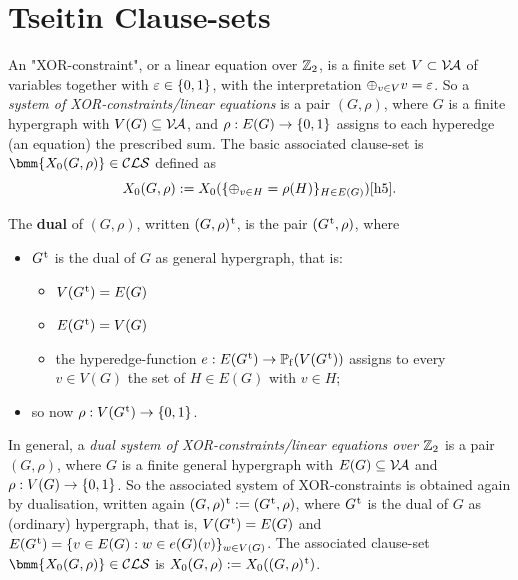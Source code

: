 \documentclass[12pt]{book}
\begin{document}
\section{Tseitin Clause-sets}
\label{sec:Tseitin Clause-sets}	  

An "XOR-constraint", or a linear equation over $\mathbb{Z}_2$, is a finite set $V \subset \mathcal{V\hspace{-0.1em}A}$ of variables together with $\varepsilon \in \{ 0,1 \}$, with the 
interpretation $\oplus_{v \in V} v = \varepsilon$. So a \emph{system of XOR-constraints/linear equations} is a pair $(G,\rho)$, where $G$ is a finite 
hypergraph with $V(G) \subseteq \mathcal{V\hspace{-0.1em}A}$, and $\rho: E(G) \rightarrow \{ 0,1 \}$ assigns to each hyperedge (an equation) the prescribed sum. The basic associated 
clause-set is $\bmm{X_0(G,\rho)} \in \Cls$ defined as
\begin{displaymath}
  X_0(G,\rho) := X_0(\{ \oplus_{v \in H} = \rho(H) \}_{H \in E(G)}) \cite{h5}.
\end{displaymath}

The \textbf{dual} of $(G,\rho)$, written $(G,\rho)^{\hspace{0.05em}\mathrm{t}}$, is the pair $(G^{\hspace{0.05em}\mathrm{t}}, \rho)$, where
\begin{itemize}
\item $G^{\hspace{0.05em}\mathrm{t}}$ is the dual of $G$ as general hypergraph, that is:
  \begin{itemize}
  \item $V(G^{\hspace{0.05em}\mathrm{t}}) = E(G)$
  \item $E(G^{\hspace{0.05em}\mathrm{t}}) = V(G)$
  \item the hyperedge-function $e: E(G^{\hspace{0.05em}\mathrm{t}}) \rightarrow \operatorname{\mathbb{P}_f}(V(G^{\hspace{0.05em}\mathrm{t}}))$ assigns to every $v \in V(G)$ the set of $H \in E(G)$ with $v \in H$;
  \end{itemize}
\item so now $\rho: V(G^{\hspace{0.05em}\mathrm{t}}) \rightarrow \{ 0,1 \}$.
\end{itemize}
In general, a \emph{dual system of XOR-constraints/linear equations over $\mathbb{Z}_2$} is a pair $(G,\rho)$, where $G$ is a finite general hypergraph 
with $E(G) \subseteq \mathcal{V\hspace{-0.1em}A}$ and $\rho: V(G) \rightarrow \{ 0,1 \}$. So the associated system of XOR-constraints is obtained again by dualisation, written again 
$(G,\rho)^{\hspace{0.05em}\mathrm{t}} := (G^{\hspace{0.05em}\mathrm{t}},\rho)$, where $G^{\hspace{0.05em}\mathrm{t}}$ is the dual of $G$ as (ordinary) hypergraph, that is, $V(G^{\hspace{0.05em}\mathrm{t}}) = E(G)$ and $E(G^{\hspace{0.05em}\mathrm{t}}) = \{ v \in E(G) : w \in e(G)(v) \}_{w \in V(G)}$. 
The associated clause-set $\bmm{X_0(G,\rho)} \in \Cls$ is $X_0(G,\rho) := X_0((G,\rho)^{\hspace{0.05em}\mathrm{t}})$.
\end{document}
